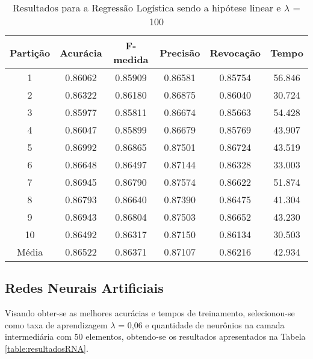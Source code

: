 \begin{table}[h]
\centering
\caption{Resultados para a Regressão Logística sendo a hipótese linear e \(\lambda\) = 100}
\vspace{0.2cm}
\begin{tabular}{c|c|c|c|c|c}
Partição & Acurácia & F-medida & Precisão & Revocação & Tempo \\
\hline
1  & 0.86062 & 0.85909 & 0.86581 & 0.85754 & 56.846 \\      
2  & 0.86322 & 0.86180 & 0.86875 & 0.86040 & 30.724 \\      
3  & 0.85977 & 0.85811 & 0.86674 & 0.85663 & 54.428 \\      
4  & 0.86047 & 0.85899 & 0.86679 & 0.85769 & 43.907 \\      
5  & 0.86992 & 0.86865 & 0.87501 & 0.86724 & 43.519 \\      
6  & 0.86648 & 0.86497 & 0.87144 & 0.86328 & 33.003 \\      
7  & 0.86945 & 0.86790 & 0.87574 & 0.86622 & 51.874 \\    
8  & 0.86793 & 0.86640 & 0.87390 & 0.86475 & 41.304 \\      
9  & 0.86943 & 0.86804 & 0.87503 & 0.86652 & 43.230 \\      
10 & 0.86492 & 0.86317 & 0.87150 & 0.86134 & 30.503 \\
\hline
Média & 0.86522 & 0.86371 & 0.87107 & 0.86216 & 42.934

\end{tabular} 
\label{table:resultadosRL}
\end{table}

\subsection{Redes Neurais Artificiais}
	
	Visando obter-se as melhores acurácias e tempos de treinamento, selecionou-se como taxa de aprendizagem \(\lambda\) = 0,06 e quantidade de neurônios na camada intermediária com 50 elementos, obtendo-se os resultados apresentados na Tabela \ref{table:resultadosRNA}.
	

